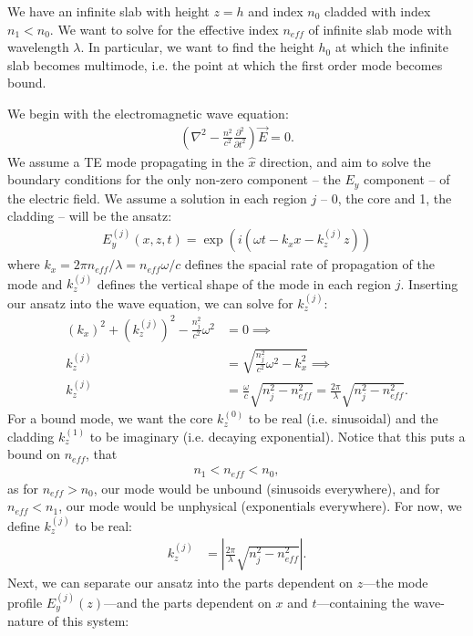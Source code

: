 \documentclass[10pt, letter, oneside,graphicx]{article}
\begin{document}
We have an infinite slab with height $z = h$ and index $n_0$ cladded with index $n_1 < n_0$. We want to solve for the effective index $n_{eff}$ of infinite slab mode with wavelength $\lambda$. In particular, we want to find the height $h_0$ at which the infinite slab becomes multimode, i.e. the point at which the first order mode becomes bound.

We begin with the electromagnetic wave equation:
\begin{align*}
\left(\nabla^2 - \frac{n^2}{c^2}\frac{\partial^2}{\partial t^2}\right) \vec E = 0.
\end{align*}
We assume a TE mode propagating in the $\hat x$ direction, and aim to solve the boundary conditions for the only non-zero component -- the $E_y$ component -- of the electric field. We assume a solution in each region $j$ -- 0, the core and 1, the cladding -- will be the ansatz:
\begin{align*}
E_y^{(j)}(x,z,t) = \exp(i(\omega t - k_xx - k_z^{(j)}z))
\end{align*}
where $k_x = 2\pi n_{eff}/\lambda = n_{eff}\omega/c$ defines the spacial rate of propagation of the mode and $k_z^{(j)}$ defines the vertical shape of the mode in each region $j$. Inserting our ansatz into the wave equation, we can solve for $k_z^{(j)}$:
\begin{align*}
(k_x)^2 + (k_z^{(j)})^2 - \frac{n_j^2}{c^2}\omega^2 &= 0 \implies \\
k_z^{(j)} &= \sqrt{ \frac{n_j^2}{c^2}\omega^2 - k_x^2 } \implies \\
k_z^{(j)} &= \frac{\omega}{c}\sqrt{ n_j^2 - n_{eff}^2 } = \frac{2\pi}{\lambda}\sqrt{ n_j^2 - n_{eff}^2 }.
\end{align*}
For a bound mode, we want the core $k_z^{(0)}$ to be real (i.e. sinusoidal) and the cladding $k_z^{(1)}$ to be imaginary (i.e. decaying exponential). Notice that this puts a bound on $n_{eff}$, that
\begin{align*}
n_1 < n_{eff} < n_0,
\end{align*}
as for $n_{eff} > n_0$, our mode would be unbound (sinusoids everywhere), and for $n_{eff} < n_1$, our mode would be unphysical (exponentials everywhere). For now, we define $k_z^{(j)}$ to be real:
\begin{align*}
k_z^{(j)} &= \left| \frac{2\pi}{\lambda}\sqrt{ n_j^2 - n_{eff}^2 } \right|.
\end{align*}
Next, we can separate our ansatz into the parts dependent on $z$---the mode profile $E_y^{(j)}(z)$---and the parts dependent on $x$ and $t$---containing the wave-nature of this system:
\end{document}
